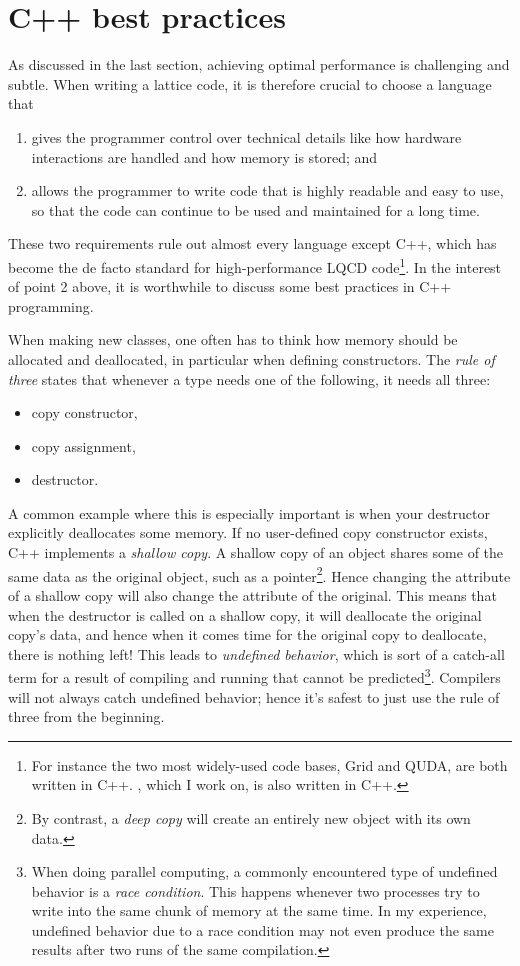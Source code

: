 \section{C++ best practices}

As discussed in the last section, achieving optimal performance is challenging
and subtle. When writing a lattice code, it is therefore crucial to choose
a language that
\begin{enumerate}
  \item gives the programmer control over technical details like how hardware
interactions are handled and how memory is stored; and
  \item allows the programmer to write code that is highly readable and
easy to use, so that the code can continue to be used and maintained
for a long time.
\end{enumerate}
These two requirements rule out almost every language except C++, which has
become the de facto standard for high-performance LQCD code\footnote{For
instance the two most widely-used code bases, Grid and QUDA, are both
written in C++. \simulat, which I work on, is also written in C++.}.
In the interest of point 2 above, it is worthwhile to discuss some
best practices in C++ programming.

When making new classes, one often has to think how memory should be allocated
and deallocated, in particular when defining constructors. The {\it rule of
three} states that whenever a type needs one of the
following, it needs all three:
\begin{itemize}
  \item copy constructor,
  \item copy assignment,
  \item destructor.
\end{itemize}
A common example where this is especially important is when your destructor 
explicitly deallocates some memory. If no user-defined copy constructor exists,
C++ implements a {\it shallow copy}. A shallow copy of an
object shares some of the same data as the original object, such as a 
pointer\footnote{By contrast, a {\it deep copy} will create
an entirely new object with its own data.}.
Hence changing the attribute of a shallow copy will also change the attribute of
the original. This means that when the destructor is called on a shallow copy,
it will deallocate the original copy's data, and hence when it comes time for
the original copy to deallocate, there is nothing left!
This leads to {\it undefined behavior}, which is sort
of a catch-all term for a result of compiling and running that cannot be
predicted\footnote{When doing parallel computing, a commonly encountered type of
undefined behavior is a {\it race condition}. 
This happens whenever two
processes try to write into the same chunk of memory at the same time. In my
experience, undefined behavior due to a race condition may not even produce the
same results after two runs of the same compilation.}. Compilers will not always
catch undefined behavior; hence it's safest to just use the rule of three from
the beginning.

